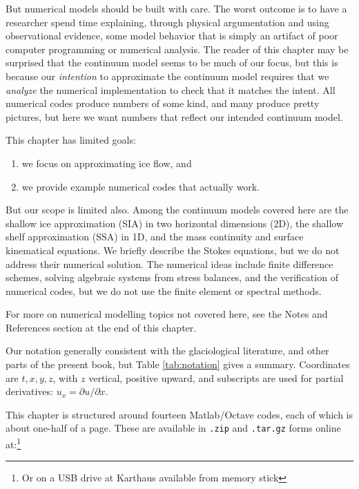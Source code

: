 \documentclass[titlepage,letterpaper,final,12pt]{scrartcl}
\begin{document}
But numerical models should be built with care.  The worst outcome is to have a researcher spend time explaining, through physical argumentation and using observational evidence, some model behavior that is simply an artifact of poor computer programming or numerical analysis.  The reader of this chapter may be surprised that the continuum model seems to be much of our focus, but this is because our \emph{intention} to approximate the continuum model requires that we \emph{analyze} the numerical implementation to check that it matches the intent.  All numerical codes produce numbers of some kind, and many produce pretty pictures, but here we want numbers that reflect our intended continuum model.

This chapter has limited goals:
  \begin{enumerate}
  \item we focus on approximating ice flow, and
  \item we provide example numerical codes that actually work.
  \end{enumerate}
But our scope is limited also.  Among the continuum models covered here are the shallow ice approximation (SIA) in two horizontal dimensions (2D), the shallow shelf approximation (SSA) in 1D, and the mass continuity and surface kinematical equations.  We briefly describe the Stokes equations, but we do not address their numerical solution.  The numerical ideas include finite difference schemes, solving algebraic systems from stress balances, and the verification of numerical codes, but we do not use the finite element or spectral methods.

For more on numerical modelling topics not covered here, see the Notes and References section at the end of this chapter.

Our notation generally consistent with the glaciological literature, and other parts of the present book, but Table \ref{tab:notation} gives a summary.  Coordinates are $t,x,y,z$, with $z$ vertical, positive upward, and subscripts are used for partial derivatives: $u_x = \partial u/\partial x$.

This chapter is structured around fourteen Matlab/Octave codes, each of which is about one-half of a page.  These are available in \texttt{.zip} and \texttt{.tar.gz} forms online at:\footnote{Or on a USB drive at Karthaus available from memory stick}
\end{document}
